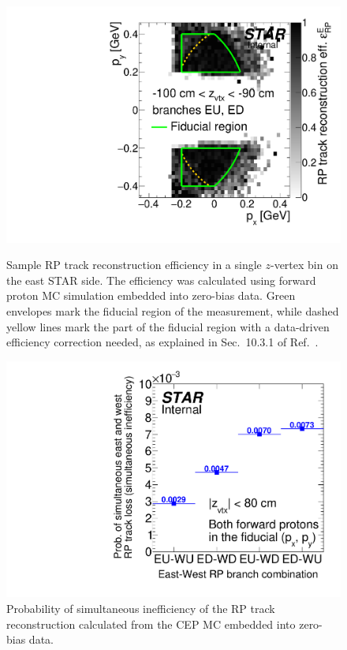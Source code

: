 \begin{figure}[ht!]%
\centering%
\begin{minipage}{.4725\textwidth}%
  \centering%
  \includegraphics[width=\linewidth,page=10]{graphics/corrections/mcFullEffPxPy.pdf}%
  \caption[Sample RP track reconstruction efficiency in a single $z$-vertex bin.]{Sample RP track reconstruction efficiency in a single $z$-vertex bin on the east STAR side. The efficiency was calculated using forward proton MC simulation embedded into zero-bias data. Green envelopes mark the fiducial region of the measurement, while dashed yellow lines mark the part of the fiducial region with a data-driven efficiency correction needed, as explained in Sec.~10.3.1 of Ref.~\cite{supplementaryNote}.}\label{fig:rpEffSample}
\end{minipage}%
\quad\quad%
\begin{minipage}{.4725\textwidth}%
  \centering
  \includegraphics[width=\linewidth]{graphics/corrections/SimultaneousEastWestRpTrackLoss.pdf}%
  \caption{Probability of simultaneous inefficiency of the RP track reconstruction calculated from the CEP MC embedded into zero-bias data.\newline\newline\newline\newline\newline}\label{fig:SimultaneousEastWestRpTrackLoss}
\end{minipage}%
\end{figure}%
